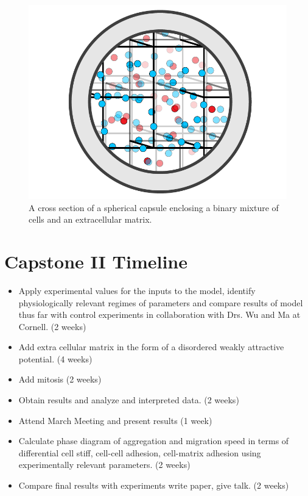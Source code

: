 \documentclass[aps,prb,twocolumn,groupedaddress,nofootinbib,floatfix]{revtex4}
\begin{document}
\begin{figure}
  \includegraphics[width=0.9\columnwidth]{Fig2.png}
  \caption[capsuleECM]
   {A cross section of a spherical capsule enclosing a binary mixture of 
   cells and an extracellular matrix.}
   \label{fig:capsuleECM}
\end{figure}

\section*{Capstone II Timeline}
\begin{itemize}\itemsep1pt \parskip0pt
\item Apply experimental values for the inputs to the model, identify physiologically relevant regimes of parameters
and compare results of model thus far with control experiments in collaboration with Drs. Wu and Ma at Cornell. (2 weeks) 
\item Add extra cellular matrix in the form of a disordered weakly attractive potential. (4 weeks) 
\item Add mitosis (2 weeks)
\item Obtain results and analyze and interpreted  data. (2 weeks)
\item Attend March Meeting and present results (1 week)
\item Calculate phase diagram of aggregation and migration speed in terms of differential 
cell stiff, cell-cell adhesion, cell-matrix adhesion using experimentally relevant parameters. (2 weeks)
 \item Compare final results with experiments  write paper, give talk. (2 weeks)
\end{itemize}
\end{document}
